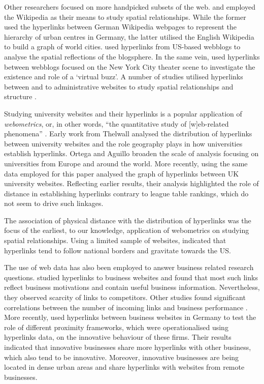 \documentclass[sigconf]{acmart}
\begin{document}
Other researchers focused on more handpicked subsets of the web.
\citet{kessler2017extracting} and \citet{salvini2016spatialization}
employed the Wikipedia as their means to study spatial relationships.
While the former used the hyperlinks between German Wikipedia webpages
to represent the hierarchy of urban centres in Germany, the latter
utilised the English Wikipedia to build a graph of world cities.
\citet{lin2007blog} used hyperlinks from US-based webblogs to analyse
the spatial reflections of the blogsphere. In the same vein,
\citet{jones2010blog} used hyperlinks between webblogs focused on the
New York City theater scene to investigate the existence and role of a
`virtual buzz'. A number of studies utilised hyperlinks between and to
administrative websites to study spatial relationships and structure
\citep{holmberg2009local, holmberg2010co, janc2015geography}.

Studying university websites and their hyperlinks is a popular
application of \emph{webometrics}, or, in other words, ``the
quantitative study of {[}w{]}eb-related phenomena''
\citet{thelwall_webometrics}. Early work from Thelwall
\citep{thelwall2002top, thelwall2002evidence} analysed the distribution
of hyperlinks between university websites and the role geography plays
in how universities establish hyperlinks. Ortega and Aguillo
\citetext{\citeyear{ortega2008linking}; \citeyear{ortega2008visualization}; \citeyear{ortega2009mapping}}
broaden the scale of analysis focusing on universities from Europe and
around the world. More recently, \citet{hale2014mapping} using the same
data employed for this paper analysed the graph of hyperlinks between UK
university websites. Reflecting earlier results, their analysis
highlighted the role of distance in establishing hyperlinks contrary to
league table rankings, which do not seem to drive such linkages.

The association of physical distance with the distribution of hyperlinks
was the focus of the earliest, to our knowledge, application of
webometrics on studying spatial relationships. Using a limited sample of
websites, \citet{halavais2000national} indicated that hyperlinks tend to
follow national borders and gravitate towards the US.

The use of web data has also been employed to answer business related
research questions. \citet{vaughan2006hyperlinks} studied hyperlinks to
business websites and found that most such links reflect business
motivations and contain useful business information. Nevertheless, they
observed scarcity of links to competitors. Other studies found
significant correlations between the number of incoming links and
business performance \citep{vaughan2004exploring, vaughan2004links}.
More recently, \citet{kruger2020digital} used hyperlinks between
business websites in Germany to test the role of different proximity
frameworks, which were operationalised using hyperlinks data, on the
innovative behaviour of these firms. Their results indicated that
innovative businesses share more hyperlinks with other business, which
also tend to be innovative. Moreover, innovative businesses are being
located in dense urban areas and share hyperlinks with websites from
remote businesses.
\end{document}
